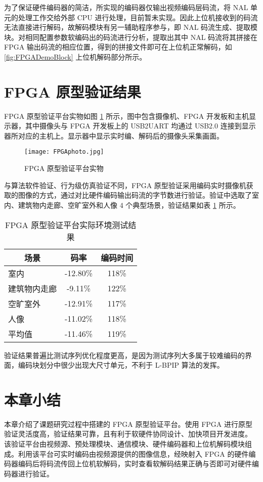 为了保证硬件编码器的简洁，所实现的编码器仅输出视频编码层码流，将 NAL 单元的处理工作交给外部 CPU 进行处理，目前暂未实现。因此上位机接收到的码流无法直接进行解码，故解码模块有另一辅助程序参与，即 NAL 码流生成、提取模块。对相同配置参数软编码出的码流进行分析，提取出其中 NAL 码流将其拼接在 FPGA 输出码流的相应位置，得到的拼接文件即可在上位机正常解码，如 \ref{fig:FPGADemoBlock} 上位机解码部分所示。

\section{FPGA 原型验证结果}
FPGA 原型验证平台实物如图 \ref{fig:FPGAphoto} 所示，图中包含摄像机、FPGA 开发板和主机显示器，其中摄像头与 FPGA 开发板上的 USB2UART 均通过 USB2.0 连接到显示器所对应的主机上。显示器中显示实时编、解码后的摄像头采集画面。
\begin{figure}[hbt]
    \centering
    \texttt{[image: FPGAphoto.jpg]}
    \caption{FPGA 原型验证平台实物}
    \label{fig:FPGAphoto}
\end{figure}

与算法软件验证、行为级仿真验证不同，FPGA 原型验证采用编码实时摄像机获取的图像的方式，通过对比硬件编码输出码流的字节数进行验证。验证中选取了室内、建筑物内走廊、空旷室外和人像 4 个典型场景，验证结果如表 \ref{tab:FPGADemoTestTab} 所示。
\begin{table}[hbt]
    \centering
    \caption{FPGA 原型验证平台实际环境测试结果}
    \label{tab:FPGADemoTestTab}
    \begin{tabular}{@{}lcc@{}}
        \toprule
        \multicolumn{1}{c}{场景} & 码率     & 编码时间 \\ \midrule
        室内                     & -12.80\% & 118\%    \\
        建筑物内走廊             & -9.11\%  & 122\%    \\
        空旷室外                 & -12.91\% & 117\%    \\
        人像                     & -11.02\% & 118\%    \\ \midrule
        平均值                   & -11.46\% & 119\%    \\ \bottomrule
    \end{tabular}
\end{table}

验证结果普遍比测试序列优化程度更高，是因为测试序列大多属于较难编码的界面，编码块划分中很少出现大尺寸单元，不利于 L-BPIP 算法的发挥。

\section{本章小结}
本章介绍了课题研究过程中搭建的 FPGA 原型验证平台。使用 FPGA 进行原型验证灵活度高，验证结果可靠，且有利于软硬件协同设计、加快项目开发进度。
该验证平台由视频源、预处理模块、通信模块、硬件编码器和上位机解码模块组成。利用该平台可实时编码由视频源提供的图像信息，经映射入 FPGA 的硬件编码器编码后将码流传回上位机软解码，实时查看软解码结果正确与否即可对硬件编码器进行验证。